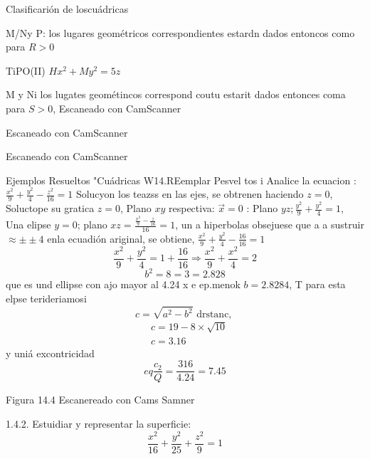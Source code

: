 

Clasificarión de loscuádricas

M/Ny P: los lugares geométricos correspondientes estardn dados entoncos como para $R>0$

TiPO(II) $H x^2+M y^2=5 z$

M y Ni los lugates geométincos correspond coutu estarit dados entonces coma para $S>0$,
Escaneado con CamScanner




Escaneado con CamScanner




Escaneado con CamScanner




Ejemplos Resueltos "Cuádricas
W14.REemplar Pesvel tos i Analice la ecuacion : $\frac{x^2}{9}+\frac{y^2}{4}-\frac{z^2}{16}=1$
Solucyon los teazss en las ejes, se obtrenen haciendo $z=0$, Soluctope su gratica
$z=0$, Plano $x y$ respectiva:
$\vec{x}=0$ : Plano $y z ; \frac{y^2}{9}+\frac{y^2}{4}=1$, Una elipse
$y=0$; plano $x z=\frac{\frac{x^2}{9}-\frac{z}{16}}{16}=1$, un a hiperbolas obsejuese que a a sustruir $\approx \pm \pm 4$ enla ecuadión ariginal,
se obtiene, $\frac{x^2}{9}+\frac{y^2}{4}-\frac{16}{16}=1$
$$
\frac{x^2}{9}+\frac{y^2}{4}=1+\frac{16}{16} \Rightarrow \frac{x^2}{9}+\frac{x^2}{4}=2
$$
$$
b^2=8=3=2.828
$$
que es und ellipse
con ajo mayor al 4.24
x e ep.menok $b=2.8284$,
T para esta elpse terideriamosi
$$
c=\sqrt{a^2-b^2} \text { drstanc, }
$$
$$
\begin{aligned}
	& c=19-8 \times \sqrt{10} \\
	& c=3.16
\end{aligned}
$$
y uniá excontricidad
$$
e q \frac{c_2}{Q}=\frac{316}{4.24}=7.45
$$

Figura 14.4
Escanereado con Cams Samner




1.4.2. Estuidiar y representar la superficie:
$$
\frac{x^2}{16}+\frac{y^2}{25}+\frac{z^2}{9}=1
$$

